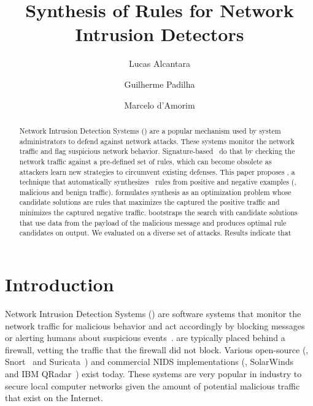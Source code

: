 \documentclass[runningheads]{llncs}
\begin{document}
%
\title{Synthesis of Rules for Network Intrusion Detectors}
%
%
\author{Lucas Alcantara \and
Guilherme Padilha \and
Marcelo d'Amorim}
%
%
%
\maketitle              %
%
\begin{abstract}
Network Intrusion Detection Systems (\nids{}) are a popular mechanism
used by system administrators to defend against network attacks. These
systems monitor the network traffic and flag suspicious network
behavior. Signature-based \nids\ do that by checking the network
traffic against a pre-defined set of rules, which can become obsolete
as attackers learn new strategies to circumvent existing defenses.
This paper proposes \tname{}, a technique that automatically
synthesizes \nids\ rules from positive and negative examples (\ie{},
malicious and benign traffic). \tname{} formulates synthesis as an
optimization problem whose candidate solutions are rules that
maximizes the captured the positive traffic and minimizes the captured
negative traffic. \tname{} bootstraps the search with candidate
solutions that use data from the payload of the malicious message and
produces optimal rule candidates on output. We evaluated \tname{} on a
diverse set of attacks. Results indicate that 



\end{abstract}
%
%
%
\section{Introduction}

Network Intrusion Detection Systems (\nids{}) are software systems
that monitor the network traffic for malicious behavior and act
accordingly by blocking messages or alerting humans about suspicious
events~\cite{Mitchell:2014:SID:2597757.2542049}. \nids{} are typically
placed behind a firewall, vetting the traffic that the firewall did
not block. Various open-source (\eg{}, Snort~\cite{snort} and
Suricata~\cite{suricata}) and commercial NIDS implementations (\eg{},
SolarWinds~\cite{solarwinds} and IBM QRadar~\cite{qradar}) exist
today. These systems are very popular in industry to secure local
computer networks given the amount of potential malicious traffic that
exist on the Internet.
\end{document}
